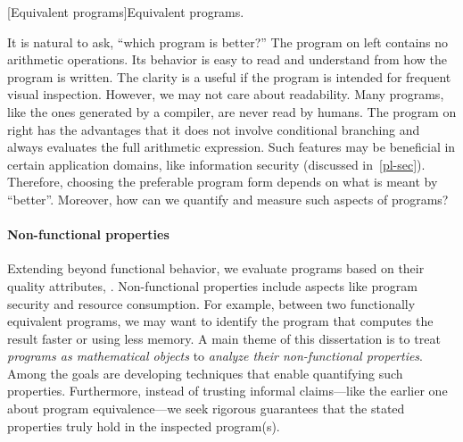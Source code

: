 \begin{center}
\captionsetup{type=lstlisting}
\begin{minipage}{.3\textwidth}

\end{minipage}%
\hspace{5em}%
\begin{minipage}{.4\textwidth}
\captionsetup{type=lstlisting}

\end{minipage}
[Equivalent programs]{Equivalent programs.}
\label{lst:intro}
\end{center}

It is natural to ask, \enquote{which program is better?} The program on left
contains no arithmetic operations. Its behavior is easy to read and understand
from how the program is written. The clarity is a useful if the program is
intended for frequent visual inspection. However, we may not care about
readability. Many programs, like the ones generated by a compiler, are never
read by humans. The program on right has the advantages that it does not involve
conditional branching and always evaluates the full arithmetic expression. Such
features may be beneficial in certain application domains, like information
security (discussed in~\autoref{pl-sec}). Therefore, choosing the preferable
program form depends on what is meant by \enquote{better}. Moreover, how can we
quantify and measure such aspects of programs?

\paragraph*{Non-functional properties}
Extending beyond functional behavior, we evaluate programs based on their
quality attributes, \ie \emph{}. Non-functional
properties include aspects like program security and resource consumption. For
example, between two functionally equivalent programs, we may want to identify
the program that computes the result faster or using less memory. A main theme
of this dissertation is to treat \emph{programs as mathematical objects} to
\emph{analyze their non-functional properties}. Among the goals are developing
techniques that enable quantifying such properties. Furthermore, instead of
trusting informal claims---like the earlier one about program equivalence---we
seek rigorous guarantees that the stated properties truly hold in the inspected
program(s).

